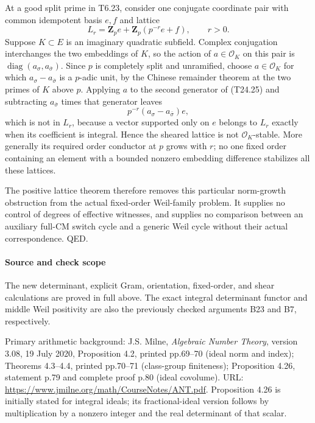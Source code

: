 \documentclass[11pt,a4paper]{article}
\theoremstyle{definition}
\begin{document}
At a good split prime in T6.23, consider one conjugate coordinate pair with common idempotent basis \(e,f\) and lattice \[
 L_r=\mathbf Z_p e+\mathbf Z_p(p^{-r}e+f),\qquad r>0.
 \tag{T24.25}
\] Suppose \(K\subset E\) is an imaginary quadratic subfield. Complex conjugation interchanges the two embeddings of \(K\), so the action of \(a\in\mathcal O_K\) on this pair is \(\operatorname{diag}(a_\sigma,a_{\bar\sigma})\). Since \(p\) is completely split and unramified, choose \(a\in\mathcal O_K\) for which \(a_\sigma-a_{\bar\sigma}\) is a \(p\)-adic unit, by the Chinese remainder theorem at the two primes of \(K\) above \(p\). Applying \(a\) to the second generator of (T24.25) and subtracting \(a_{\bar\sigma}\) times that generator leaves \[
 p^{-r}(a_\sigma-a_{\bar\sigma})e,
 \tag{T24.26}
\] which is not in \(L_r\), because a vector supported only on \(e\) belongs to \(L_r\) exactly when its coefficient is integral. Hence the sheared lattice is not \(\mathcal O_K\)-stable. More generally its required order conductor at \(p\) grows with \(r\); no one fixed order containing an element with a bounded nonzero embedding difference stabilizes all these lattices.

The positive lattice theorem therefore removes this particular norm-growth obstruction from the actual fixed-order Weil-family problem. It supplies no control of degrees of effective witnesses, and supplies no comparison between an auxiliary full-CM switch cycle and a generic Weil cycle without their actual correspondence. QED.

\paragraph{Source and check scope}\label{source-and-check-scope}

The new determinant, explicit Gram, orientation, fixed-order, and shear calculations are proved in full above. The exact integral determinant functor and middle Weil positivity are also the previously checked arguments B23 and B7, respectively.

Primary arithmetic background: J.S. Milne, \emph{Algebraic Number Theory}, version 3.08, 19 July 2020, Proposition 4.2, printed pp.69--70 (ideal norm and index); Theorems 4.3--4.4, printed pp.70--71 (class-group finiteness); Proposition 4.26, statement p.79 and complete proof p.80 (ideal covolume). URL: \url{https://www.jmilne.org/math/CourseNotes/ANT.pdf}. Proposition 4.26 is initially stated for integral ideals; its fractional-ideal version follows by multiplication by a nonzero integer and the real determinant of that scalar.
\end{document}
